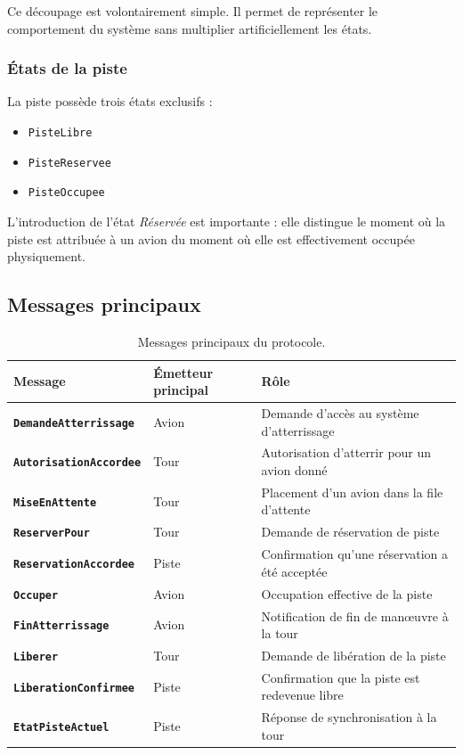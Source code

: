 \documentclass[11pt,a4paper]{article}
\begin{document}
Ce découpage est volontairement simple. Il permet de représenter le comportement du système sans multiplier artificiellement les états.

\subsubsection{États de la piste}

La piste possède trois états exclusifs :
\begin{itemize}
    \item \texttt{PisteLibre}
    \item \texttt{PisteReservee}
    \item \texttt{PisteOccupee}
\end{itemize}

L'introduction de l'état \emph{Réservée} est importante : elle distingue le moment où la piste est attribuée à un avion du moment où elle est effectivement occupée physiquement.

\subsection{Messages principaux}

\begin{table}[H]
\centering
\caption{Messages principaux du protocole.}
\begin{tabularx}{\textwidth}{>{\bfseries}p{4.2cm} Y Y}
\toprule
Message & Émetteur principal & Rôle \\
\midrule
\texttt{DemandeAtterrissage} & Avion & Demande d'accès au système d'atterrissage \\
\texttt{AutorisationAccordee} & Tour & Autorisation d'atterrir pour un avion donné \\
\texttt{MiseEnAttente} & Tour & Placement d'un avion dans la file d'attente \\
\texttt{ReserverPour} & Tour & Demande de réservation de piste \\
\texttt{ReservationAccordee} & Piste & Confirmation qu'une réservation a été acceptée \\
\texttt{Occuper} & Avion & Occupation effective de la piste \\
\texttt{FinAtterrissage} & Avion & Notification de fin de manœuvre à la tour \\
\texttt{Liberer} & Tour & Demande de libération de la piste \\
\texttt{LiberationConfirmee} & Piste & Confirmation que la piste est redevenue libre \\
\texttt{EtatPisteActuel} & Piste & Réponse de synchronisation à la tour \\
\bottomrule
\end{tabularx}
\end{table}
\end{document}
